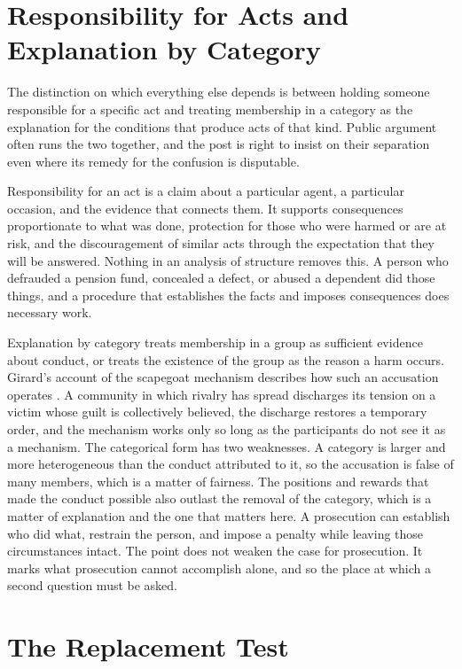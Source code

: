 \documentclass[11pt]{article}
\theoremstyle{definition}
\begin{document}
\section{Responsibility for Acts and Explanation by Category}

The distinction on which everything else depends is between holding someone responsible for a specific act and treating membership in a category as the explanation for the conditions that produce acts of that kind. Public argument often runs the two together, and the post is right to insist on their separation even where its remedy for the confusion is disputable.

Responsibility for an act is a claim about a particular agent, a particular occasion, and the evidence that connects them. It supports consequences proportionate to what was done, protection for those who were harmed or are at risk, and the discouragement of similar acts through the expectation that they will be answered. Nothing in an analysis of structure removes this. A person who defrauded a pension fund, concealed a defect, or abused a dependent did those things, and a procedure that establishes the facts and imposes consequences does necessary work.

Explanation by category treats membership in a group as sufficient evidence about conduct, or treats the existence of the group as the reason a harm occurs. Girard's account of the scapegoat mechanism describes how such an accusation operates \cite{girard1986}. A community in which rivalry has spread discharges its tension on a victim whose guilt is collectively believed, the discharge restores a temporary order, and the mechanism works only so long as the participants do not see it as a mechanism. The categorical form has two weaknesses. A category is larger and more heterogeneous than the conduct attributed to it, so the accusation is false of many members, which is a matter of fairness. The positions and rewards that made the conduct possible also outlast the removal of the category, which is a matter of explanation and the one that matters here. A prosecution can establish who did what, restrain the person, and impose a penalty while leaving those circumstances intact. The point does not weaken the case for prosecution. It marks what prosecution cannot accomplish alone, and so the place at which a second question must be asked.

\section{The Replacement Test}
\end{document}
